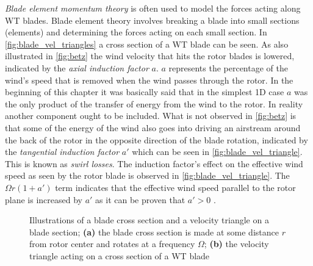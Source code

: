 \smallskip
\textit{Blade element momentum theory} is often used to model the forces acting along WT blades. Blade element theory involves breaking a blade into small sections (elements) and determining the forces acting on each small section. In \cref{fig:blade_vel_triangles} a cross section of a WT blade can be seen. As also illustrated in \cref{fig:betz} the wind velocity that hits the rotor blades is lowered, indicated by the \textit{axial induction factor} $ a $. $ a $ represents the percentage of the wind's speed that is removed when the wind passes through the rotor. In the beginning of this chapter it was basically said that in the simplest 1D case $ a $ was the only product of the transfer of energy from the wind to the rotor. In reality another component ought to be included. What is not observed in \cref{fig:betz} is that some of the energy of the wind also goes into driving an airstream around the back of the rotor in the opposite direction of the blade rotation, indicated by the \textit{tangential induction factor} $ a' $ which can be seen in \cref{fig:blade_vel_triangle}. This is known as \textit{swirl losses}. The induction factor's effect on the effective wind speed as seen by the rotor blade is observed in \cref{fig:blade_vel_triangle}. The $ \Omega r (1+a') $ term indicates that the effective wind speed parallel to the rotor plane is increased by $ a' $ as it can be proven that $ a' > 0 $ \cite{Valentine2015}.
\begin{figure}[ht]
	\centering
	\hfil
	\caption{Illustrations of a blade cross section and a velocity triangle on a blade section; \textbf{(a)} the blade cross section is made at some distance $ r $ from rotor center and rotates at a frequency $ \Omega $; \textbf{(b)} the velocity triangle acting on a cross section of a WT blade}
	\label{fig:blade_triangles}
\end{figure}

